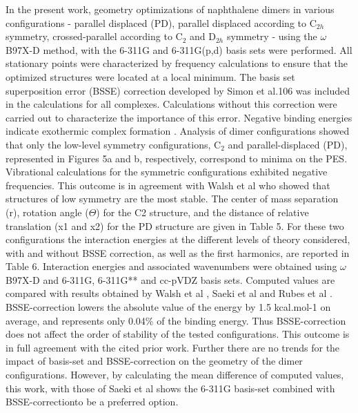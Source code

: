 In the present work, geometry optimizations of naphthalene dimers in various configurations - parallel displaced (PD), parallel displaced according to C$_{2h}$ symmetry, crossed-parallel according to C$_{2}$ and D$_{2h}$ symmetry - using the $\omega$B97X-D method, with the 6-311G and 6-311G(p,d) basis sets were performed. All stationary points were characterized by frequency calculations to ensure that the optimized structures were located at a local minimum. The basis set superposition error (BSSE) correction developed by Simon et al.106 was included in the calculations for all complexes. Calculations without this correction were carried out to characterize the importance of this error. Negative binding energies indicate exothermic complex formation \cite{boys2002calculation}. Analysis of dimer configurations showed that only the low-level symmetry configurations, C$_{2}$ and parallel-displaced (PD), represented in Figures 5a and b, respectively, correspond to minima on the PES. Vibrational calculations for the symmetric configurations exhibited negative frequencies. This outcome is in agreement with Walsh et al \cite{walsh2002ab} who showed that structures of low symmetry are the most stable. The center of mass separation (r), rotation angle ($\Theta$) for the C2 structure, and the distance of relative translation (x1 and x2) for the PD structure are given in Table 5. For these two configurations the interaction energies at the different levels of theory considered, with and without BSSE correction, as well as the first harmonics, are reported in Table 6. Interaction energies and associated wavenumbers were obtained using $\omega$B97X-D and 6-311G, 6-311G** and cc-pVDZ basis sets. Computed values are compared with results obtained by Walsh et al \cite{walsh2002ab}, Saeki et al \cite{saeki2006theoretical} and Rubes et al \cite{rubevs2008investigation}. BSSE-correction lowers the absolute value of the energy by 1.5 kcal.mol-1 on average, and represents only 0.04\% of the binding energy.  Thus BSSE-correction does not affect the order of stability of the tested configurations. This outcome is in full agreement with the cited prior work. Further there are no trends for the impact of basis-set and BSSE-correction on the geometry of the dimer configurations. However, by calculating the mean difference of computed values, this work, with those of Saeki et al \cite{saeki2006theoretical} shows the  6-311G basis-set combined with BSSE-correctionto be a preferred option.

